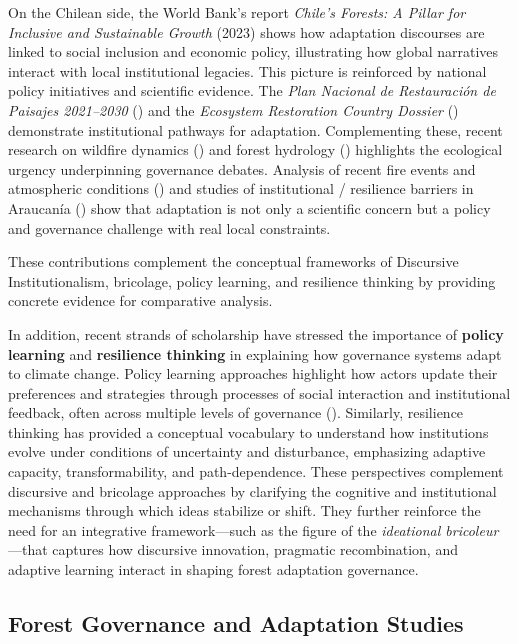 On the Chilean side, the World Bank’s report \textit{Chile’s Forests: A Pillar 
for Inclusive and Sustainable Growth} (2023) shows how adaptation discourses
are linked to social inclusion and economic policy, illustrating how global 
narratives interact with local institutional legacies. This picture is reinforced 
by national policy initiatives and scientific evidence. The \textit{Plan Nacional de 
Restauración de Paisajes 2021--2030} (\citealp{MMA2021}) and the 
\textit{Ecosystem Restoration Country Dossier} (\citealp{MMACONAF2024}) demonstrate 
institutional pathways for adaptation. Complementing these, recent research on 
wildfire dynamics (\citealp{VidalSilva2025}) and forest hydrology (\citealp{Balocchi2023}) 
highlights the ecological urgency underpinning governance debates.
Analysis of recent fire events and atmospheric conditions (\citealp{McWethy2021FiresChile}) 
and studies of institutional / resilience barriers in Araucanía (\citealp{Banwell2020AraucaniaResilience}) 
show that adaptation is not only a scientific concern but a policy and governance 
challenge with real local constraints.

These contributions complement the conceptual frameworks of Discursive Institutionalism, 
bricolage, policy learning, and resilience thinking by providing concrete evidence for 
comparative analysis.

In addition, recent strands of scholarship have stressed the importance of 
\textbf{policy learning} and \textbf{resilience thinking} in explaining how 
governance systems adapt to climate change. Policy learning approaches highlight 
how actors update their preferences and strategies through processes of social 
interaction and institutional feedback, often across multiple levels of governance 
(\citealp{DuitGalaz2020,JordanHuitema2019}). Similarly, resilience thinking has 
provided a conceptual vocabulary to understand how institutions evolve under 
conditions of uncertainty and disturbance, emphasizing adaptive capacity, 
transformability, and path-dependence. These perspectives complement discursive 
and bricolage approaches by clarifying the cognitive and institutional mechanisms 
through which ideas stabilize or shift. They further reinforce the need for an 
integrative framework---such as the figure of the \textit{ideational bricoleur}---that 
captures how discursive innovation, pragmatic recombination, and adaptive learning 
interact in shaping forest adaptation governance.

\subsection*{Forest Governance and Adaptation Studies}

